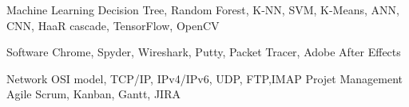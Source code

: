 \begin{cvskills}
\cvskill
    {Machine Learning} %
    {Decision Tree, Random Forest, K-NN, SVM, K-Means, ANN, CNN, HaaR cascade, TensorFlow, OpenCV } %


\cvskill
    {Software} %
    {Chrome, Spyder, Wireshark, Putty, Packet Tracer, Adobe After Effects } %

  \cvskill
    {Network} %
    {OSI model, TCP/IP, IPv4/IPv6, UDP, FTP,IMAP   } %
\cvskill
    {Projet Management} %
    {Agile Scrum, Kanban, Gantt, JIRA } %

\end{cvskills}
